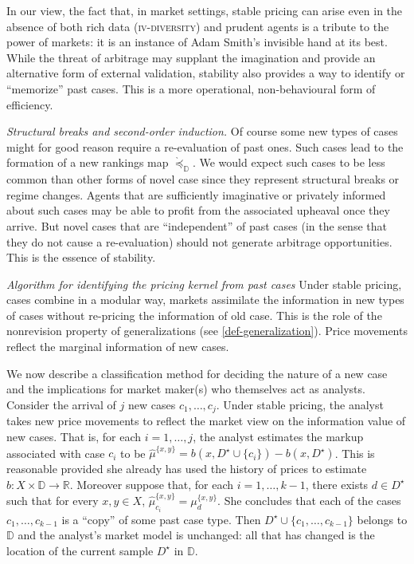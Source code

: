 \documentclass[ecta,nameyear,draft]{econsocart}
\newcommand{\R}{\mathbb R}
\newcommand{\mbbd}{{\mathds D}}
\newcommand{\past}{{D^\star}}
\newcommand{\fourdiv}{\textsc{iv}-\textsc{diversity}}
\theoremstyle{plain}
\theoremstyle{remark}
\begin{document}
%

In our view, the fact that, in market settings, stable pricing can arise even
in the absence of both rich data (\fourdiv) and prudent agents is a tribute to
the power of markets: it is an instance of Adam Smith's invisible hand at its
best. While the threat of arbitrage may supplant the imagination and provide an
alternative form of external validation, stability also provides a way to
identify or ``memorize'' past cases. This is a more operational,
non-behavioural form of efficiency.

\emph{Structural breaks and second-order induction.} Of course some new
types of cases might for good reason require a re-evaluation of past ones. Such
cases lead to the formation of a new rankings map $\grave{\preceq}_{\mbbd}$. We
would expect such cases to be less common than other forms of novel case since
they represent structural breaks or regime changes.  Agents that are
sufficiently imaginative or privately informed about such cases may be able to
profit from the associated upheaval once they arrive. But novel cases that are
``independent'' of past cases (in the sense that they do not cause a
re-evaluation) should not generate arbitrage opportunities. This is the essence
of stability.

\emph{Algorithm for identifying the pricing kernel from past cases} Under
stable pricing, cases combine in a modular way, markets assimilate the
information in new types of cases without re-pricing the information of old
case. This is the role of the nonrevision property of generalizations (see
\cref{def-generalization}).  Price movements reflect the marginal information
of new cases. 

We now describe a classification method for deciding the nature of a new case
and the implications for market maker(s) who themselves act as analysts.
Consider the arrival of $j$ new cases ${c}_1, \dots, {c}_j$.  Under stable
pricing, the analyst takes new price movements to reflect the market view on
the information value of new cases.  That is, for each $i = 1,\dots, j$, the
analyst estimates the markup associated with case $c_i$ to be
$\hat{\mu}^{\{x,y\}} = b(x, \past \cup \{c_i\}) - b(x, \past) $.  This is
reasonable provided she already has used the history of prices to estimate
$b:X\times \mbbd \rightarrow \R$. Moreover suppose that, for each $i = 1,
\dots, k-1$, there exists $d\in \past$ such that for every $x,y \in X$,
$\hat{\mu}^{\{x,y\}}_{c_i} = \mu^{\{x,y\}}_{d}$.  She concludes that each of
the cases $c_1, \dots, c_{k-1}$ is a ``copy'' of some past case type. Then
$\past \cup \{c_1, \dots, c_{k-1}\}$ belongs to $\mbbd$ and the analyst's
market model is unchanged: all that has changed is the location of the current
sample $\past$ in $\mbbd$.
\end{document}
